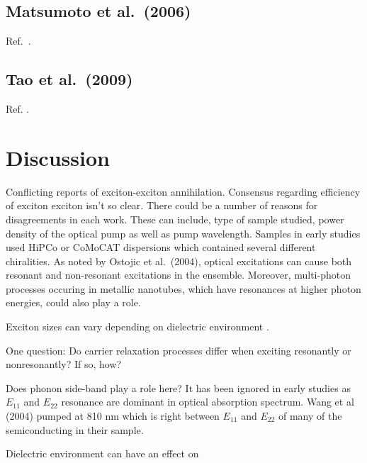 \subsection{Matsumoto et al.\ (2006)}

Ref.\ \cite{matsumoto2006optical}.

\subsection{Tao et al.\ (2009)}

Ref. \cite{tao2009subpicosecond}.

\section{Discussion}


Conflicting reports of exciton-exciton annihilation. Consensus regarding efficiency of exciton exciton isn't so clear. There could be a number of reasons for disagreements in each work. These can include, type of sample studied, power density of the optical pump as well as pump wavelength. Samples in early studies used HiPCo or CoMoCAT dispersions which contained several different chiralities. As noted by Ostojic et al.\ (2004), optical excitations can cause both resonant and non-resonant excitations in the ensemble. Moreover, multi-photon processes occuring in metallic nanotubes, which have resonances at higher photon energies, could also play a role.

Exciton sizes can vary depending on dielectric environment \cite{mann201613}.

One question: Do carrier relaxation processes differ when exciting resonantly or nonresonantly? If so, how?

Does phonon side-band play a role here? It has been ignored in early studies as $E_{11}$ and $E_{22}$ resonance are dominant in optical absorption spectrum.
Wang et al (2004) pumped at 810 nm which is right between $E_{11}$ and $E_{22}$ of many of the semiconducting in their sample.

Dielectric environment can have an effect on
